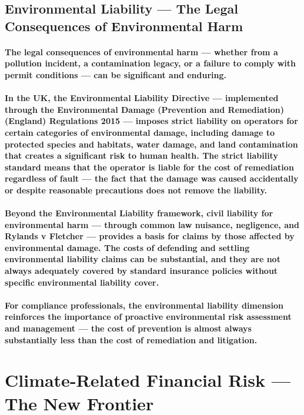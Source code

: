 \subsection{Environmental Liability — The Legal Consequences of Environmental Harm}
\paragraph{The legal consequences of environmental harm — whether from a pollution incident, a contamination legacy, or a failure to comply with permit conditions — can be significant and enduring.}
\paragraph{In the UK, the \textbf{Environmental Liability Directive} — implemented through the \textbf{Environmental Damage (Prevention and Remediation) (England) Regulations 2015} — imposes strict liability on operators for certain categories of environmental damage, including damage to protected species and habitats, water damage, and land contamination that creates a significant risk to human health. The strict liability standard means that the operator is liable for the cost of remediation regardless of fault — the fact that the damage was caused accidentally or despite reasonable precautions does not remove the liability.}
\paragraph{Beyond the Environmental Liability framework, civil liability for environmental harm — through common law nuisance, negligence, and Rylands v Fletcher — provides a basis for claims by those affected by environmental damage. The costs of defending and settling environmental liability claims can be substantial, and they are not always adequately covered by standard insurance policies without specific environmental liability cover.}
\paragraph{For compliance professionals, the environmental liability dimension reinforces the importance of proactive environmental risk assessment and management — the cost of prevention is almost always substantially less than the cost of remediation and litigation.}

\section{Climate-Related Financial Risk — The New Frontier}
